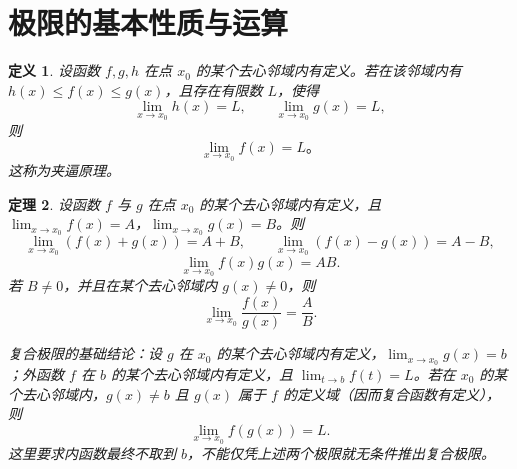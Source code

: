 \documentclass[UTF8,fontset=fandol,11pt]{ctexart}
\newtheorem{definition}{定义}[section]
\newtheorem{theorem}[definition]{定理}
\begin{document}
\section{极限的基本性质与运算}\label{sec:S02}
\begin{definition}
设函数 $f,g,h$ 在点 $x_0$ 的某个去心邻域内有定义。若在该邻域内有 $h(x)\leq f(x)\leq g(x)$，且存在有限数 $L$，使得
\[
\lim_{x\to x_0}h(x)=L,\qquad \lim_{x\to x_0}g(x)=L,
\]
则
\[
\lim_{x\to x_0}f(x)=L\text{。}
\]
这称为夹逼原理。\label{def:squeeze-principle}
\end{definition}
\begin{theorem}
设函数 $f$ 与 $g$ 在点 $x_0$ 的某个去心邻域内有定义，且 $\lim_{x\to x_0}f(x)=A$，$\lim_{x\to x_0}g(x)=B$。则
\[
\lim_{x\to x_0}(f(x)+g(x))=A+B,
\qquad
\lim_{x\to x_0}(f(x)-g(x))=A-B,
\]
\[
\lim_{x\to x_0}f(x)g(x)=AB.
\]
若 $B\neq0$，并且在某个去心邻域内 $g(x)\neq0$，则
\[
\lim_{x\to x_0}\frac{f(x)}{g(x)}=\frac{A}{B}.
\]
\label{thm:limit-algebra}

复合极限的基础结论：设 $g$ 在 $x_0$ 的某个去心邻域内有定义，$\lim_{x\to x_0}g(x)=b$；外函数 $f$ 在 $b$ 的某个去心邻域内有定义，且 $\lim_{t\to b}f(t)=L$。若在 $x_0$ 的某个去心邻域内，$g(x)\neq b$ 且 $g(x)$ 属于 $f$ 的定义域（因而复合函数有定义），则
\[
\lim_{x\to x_0}f(g(x))=L.
\]
这里要求内函数最终不取到 $b$，不能仅凭上述两个极限就无条件推出复合极限。
\end{theorem}
\end{document}
